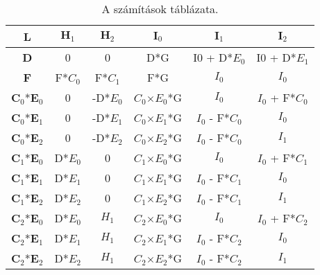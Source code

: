 \begin{table}
	\centering
	
	\begin{tabular}{|c||c|c|c|c|c|}
		\hline
		\textbf{L}     & $\textbf{H}_1$   & $\textbf{H}_2$    & $\textbf{I}_0$      & $\textbf{I}_1$        & $\textbf{I}_2$        \\ \hline
		\textbf{D}     & 0    & 0     & D*G     & I0 + D*$E_0$ & I0 + D*$E_1$ \\ \hline
		\textbf{F}     & F*$C_0$ & F*$C_1$  & F*G     & $I_0$        & $I_0$        \\ \hline
		$\textbf{C}_0$*$\textbf{E}_0$ & 0    & -D*$E_0$ & $C_0$$\times$$E_0$*G & $I_0$        & $I_0$ + F*$C_0$ \\ \hline
		$\textbf{C}_0$*$\textbf{E}_1$ & 0    & -D*$E_1$ & $C_0$$\times$$E_1$*G & $I_0$ - F*$C_0$ & $I_0$        \\ \hline
		$\textbf{C}_0$*$\textbf{E}_2$ & 0    & -D*$E_2$ & $C_0$$\times$$E_2$*G & $I_0$ - F*$C_0$ & $I_1$        \\ \hline
		$\textbf{C}_1$*$\textbf{E}_0$ & D*$E_0$ & 0     & $C_1$$\times$$E_0$*G & $I_0$        & $I_0$ + F*$C_1$ \\ \hline
		$\textbf{C}_1$*$\textbf{E}_1$ & D*$E_1$ & 0     & $C_1$$\times$$E_1$*G & $I_0$ - F*$C_1$ & $I_0$        \\ \hline
		$\textbf{C}_1$*$\textbf{E}_2$ & D*$E_2$ & 0     & $C_1$$\times$$E_2$*G & $I_0$ - F*$C_1$ & $I_1$        \\ \hline
		$\textbf{C}_2$*$\textbf{E}_0$ & D*$E_0$ & $H_1$    & $C_2$$\times$$E_0$*G & $I_0$        & $I_0$ + F*$C_2$ \\ \hline
		$\textbf{C}_2$*$\textbf{E}_1$ & D*$E_1$ & $H_1$    & $C_2$$\times$$E_1$*G & $I_0$ - F*$C_2$ & $I_0$        \\ \hline
		$\textbf{C}_2$*$\textbf{E}_2$ & D*$E_2$ & $H_1$   & $C_2$$\times$$E_2$*G & $I_0$ - F*$C_2$ & $I_1$        \\ \hline
	\end{tabular}
	\caption{A számítások táblázata.}
	\label{tab:szamitas}
\end{table}
\newpage

